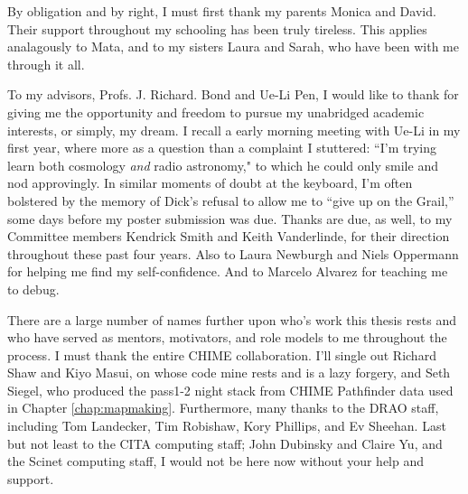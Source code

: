 \begin{acknowledgements}

By obligation and by right, I must first thank my parents Monica and David. Their support throughout my schooling has been truly tireless. This applies analagously to Mata, and to my sisters Laura and Sarah, who have been with me through it all.

To my advisors, Profs. J. Richard. Bond and Ue-Li Pen, I would like to thank for giving me the opportunity and freedom to pursue my unabridged academic interests, or simply, my dream. I recall a early morning meeting with Ue-Li in my first year, where more as a question than a complaint I stuttered: ``I'm trying learn both cosmology \textit{and} radio astronomy," to which he could only smile and nod approvingly. In similar moments of doubt at the keyboard, I'm often bolstered by the memory of Dick's refusal to allow me to ``give up on the Grail,'' some days before my poster submission was due. Thanks are due, as well, to my Committee members Kendrick Smith and Keith Vanderlinde, for their direction throughout these past four years. Also to Laura Newburgh and Niels Oppermann for helping me find my self-confidence. And to Marcelo Alvarez for teaching me to debug.

There are a large number of names further upon who's work this thesis rests and who have served as mentors, motivators, and role models to me throughout the process. I must thank the entire CHIME collaboration. I'll single out Richard Shaw and Kiyo Masui, on whose code mine rests and is a lazy forgery, and Seth Siegel, who produced the pass1-2 night stack from CHIME Pathfinder data used in Chapter \ref{chap:mapmaking}. Furthermore, many thanks to the DRAO staff, including Tom Landecker, Tim Robishaw, Kory Phillips, and Ev Sheehan. Last but not least to the CITA computing staff; John Dubinsky and Claire Yu, and the Scinet computing staff, I would not be here now without your help and support.

\end{acknowledgements}